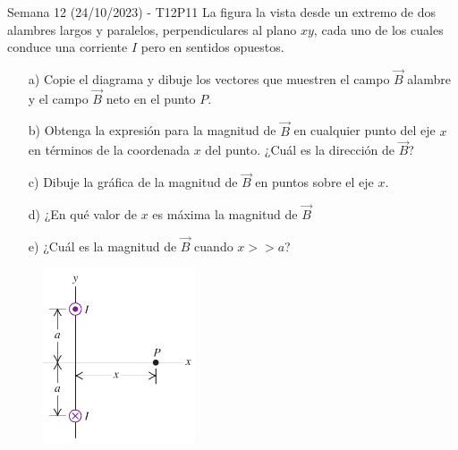 \begin{frame}{Semana 12 (24/10/2023) - T12P11}
     \footnotesize
     La figura la vista desde un extremo de dos alambres largos y paralelos, perpendiculares al plano $xy$, cada uno de los cuales conduce una corriente $I$ pero en sentidos opuestos.

     \begin{itemize}
         \item[a)] Copie el diagrama y dibuje los  vectores que muestren el campo $\vec{B}$  alambre y el campo $\vec{B}$ neto en el punto $P$.
         \item[b)] Obtenga la expresión para la magnitud de $\vec{B}$ en cualquier punto del eje $x$ en términos de la coordenada $x$ del punto. ¿Cuál es la dirección de $\vec{B}$?
         \item[c)]  Dibuje la gráfica de la magnitud de $\vec{B}$ en puntos sobre el eje $x$.
         \item[d)] ¿En qué valor de $x$ es máxima la magnitud de $\vec{B}$
         \item[e)] ¿Cuál es la magnitud de $\vec{B}$ cuando $x>>a$?
     \end{itemize}
     
    \begin{figure}
        \centering
        \includegraphics[height=0.3\textwidth,width=0.4\textwidth]{figures/t14p2.png}
    \end{figure}
    
\end{frame}

